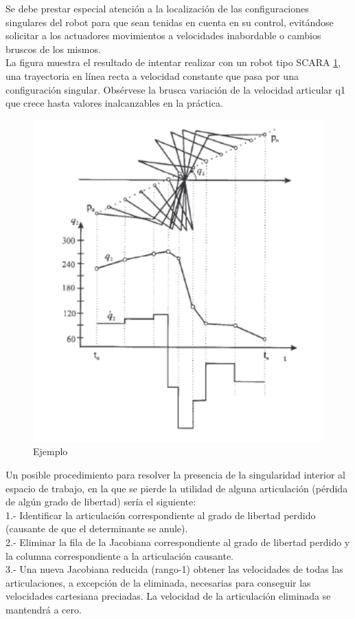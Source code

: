 \documentclass[11pt,a4paper,oldfontcommands,oneside]{memoir}
\begin{document}
Se debe prestar especial atención a la localización de las configuraciones singulares del robot para que sean tenidas en cuenta en su control, evitándose solicitar a los actuadores movimientos a velocidades inabordable o cambios bruscos de los mismos.\\
La figura muestra el resultado de intentar realizar con un robot tipo SCARA \ref{Imagen2}, una trayectoria en línea recta a velocidad constante que pasa por una configuración singular. Obsérvese la brusca variación de la velocidad articular q1 que crece hasta valores inalcanzables en la práctica.\cite{hayes2002singular}
\begin{figure}[h]
\includegraphics[scale=1.1]{link5.png}
\caption{Ejemplo}
\label{Imagen2}
\end{figure}
Un posible procedimiento para resolver la presencia de la singularidad interior al espacio de trabajo, en la que se pierde la utilidad de alguna articulación (pérdida de algún grado de libertad) sería el siguiente:\\
1.- Identificar la articulación correspondiente al grado de libertad perdido (causante de que el determinante se anule).\\
2.- Eliminar la fila de la Jacobiana correspondiente al grado de libertad perdido y la columna correspondiente a la articulación causante.\\
3.- Una nueva Jacobiana reducida (rango-1) obtener las velocidades de todas las articulaciones, a excepción de la eliminada, necesarias para conseguir las velocidades cartesiana preciadas. La velocidad de la articulación eliminada se mantendrá a cero.
\end{document}
